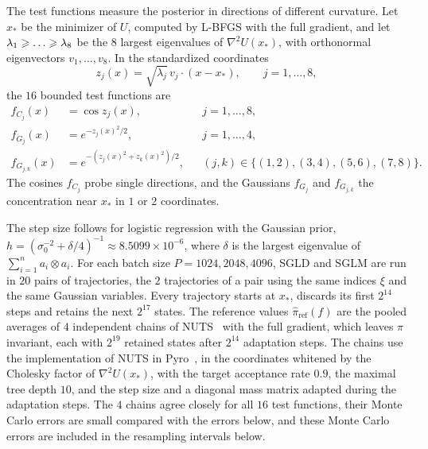 The test functions measure the posterior in directions of different curvature. Let $x_*$ be the minimizer of $U$, computed by L-BFGS with the full gradient, and let $\lambda_1 \Ge \dots \Ge \lambda_8$ be the $8$ largest eigenvalues of $\nabla^2 U(x_*)$, with orthonormal eigenvectors $v_1, \dots, v_8$. In the standardized coordinates
\begin{equation}
    z_j(x) = \sqrt{\lambda_j}\, v_j \cdot (x - x_*) , \qquad j = 1, \dots, 8 ,
    \label{eq:mnist-local-coordinates}
\end{equation}
the $16$ bounded test functions are
\begin{align}
    f_{C_j}(x) &= \cos z_j(x) , && j = 1, \dots, 8 ,
    \label{eq:mnist-cosine-observables} \\
    f_{G_j}(x) &= e^{-z_j(x)^2/2} , && j = 1, \dots, 4 ,
    \label{eq:mnist-gaussian-1d-observables} \\
    f_{G_{j,k}}(x) &= e^{-(z_j(x)^2 + z_k(x)^2)/2} , && (j,k) \in \{(1,2), (3,4), (5,6), (7,8)\} .
    \label{eq:mnist-gaussian-2d-observables}
\end{align}
The cosines $f_{C_j}$ probe single directions, and the Gaussians $f_{G_j}$ and $f_{G_{j,k}}$ the concentration near $x_*$ in $1$ or $2$ coordinates.


The step size follows \citet[Section~4]{brosse2018promises} for logistic regression with the Gaussian prior, $h = (\sigma_0^{-2} + \delta/4)^{-1} \approx 8.5099 \times 10^{-6}$, where $\delta$ is the largest eigenvalue of $\sum_{i=1}^n a_i \otimes a_i$. For each batch size $P = 1024, 2048, 4096$, SGLD and SGLM are run in $20$ pairs of trajectories, the $2$ trajectories of a pair using the same indices $\xi$ and the same Gaussian variables. Every trajectory starts at $x_*$, discards its first $2^{14}$ steps and retains the next $2^{17}$ states. The reference values $\widehat\pi_{\mathrm{ref}}(f)$ are the pooled averages of $4$ independent chains of NUTS~\citep{hoffman2014no} with the full gradient, which leaves $\pi$ invariant, each with $2^{19}$ retained states after $2^{14}$ adaptation steps. The chains use the implementation of NUTS in Pyro~\citep{bingham2019pyro}, in the coordinates whitened by the Cholesky factor of $\nabla^2 U(x_*)$, with the target acceptance rate $0.9$, the maximal tree depth $10$, and the step size and a diagonal mass matrix adapted during the adaptation steps. The $4$ chains agree closely for all $16$ test functions, their Monte Carlo errors are small compared with the errors below, and these Monte Carlo errors are included in the resampling intervals below.

